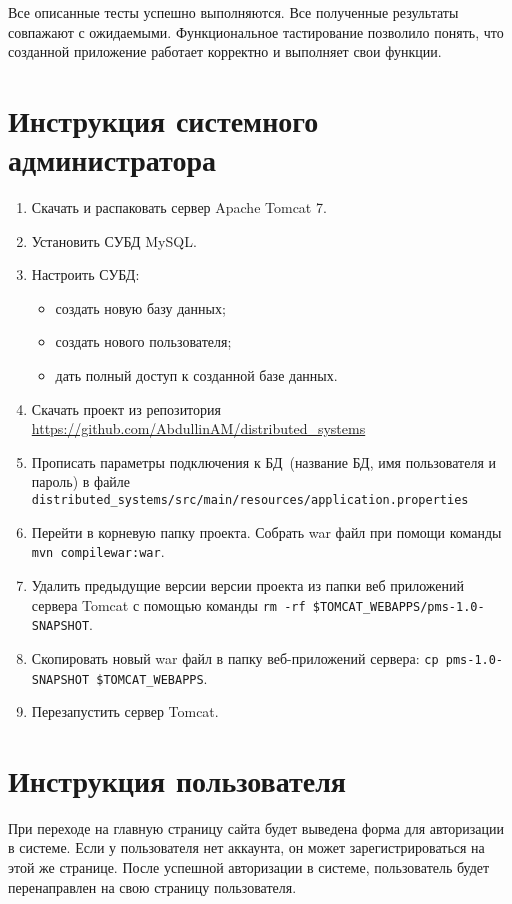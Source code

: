 Все описанные тесты успешно выполняются. Все полученные результаты совпажают с ожидаемыми. Функциональное тастирование позволило понять, что созданной приложение работает корректно и выполняет свои функции.

\section{Инструкция системного администратора}

\begin{enumerate}
\item Скачать и распаковать сервер Apache Tomcat 7.
\item Установить СУБД MySQL.
\item Настроить СУБД:
	\begin{itemize}
	\item создать новую базу данных;
	\item создать нового пользователя;
	\item дать полный доступ к созданной базе данных.
	\end{itemize}
\item Скачать проект из репозитория\\ \url{https://github.com/AbdullinAM/distributed_systems}
\item Прописать параметры подключения к БД~(название БД, имя пользователя и пароль) в файле \texttt{distributed\_systems/src/main/resources/application.properties}
\item Перейти в корневую папку проекта. Собрать war файл при помощи команды \texttt{mvn compilewar:war}.
\item Удалить предыдущие версии версии проекта из папки веб приложений сервера Tomcat с помощью команды \texttt{rm -rf \$TOMCAT\_WEBAPPS/pms-1.0-SNAPSHOT}.
\item Скопировать новый war файл в папку веб-приложений сервера: \texttt{cp pms-1.0-SNAPSHOT \$TOMCAT\_WEBAPPS}.
\item Перезапустить сервер Tomcat.
\end{enumerate}

\section{Инструкция пользователя}
При переходе на главную страницу сайта будет выведена форма для авторизации в системе. Если у пользователя нет аккаунта, он может зарегистрироваться на этой же странице. После успешной авторизации в системе, пользователь будет перенаправлен на свою страницу пользователя.

